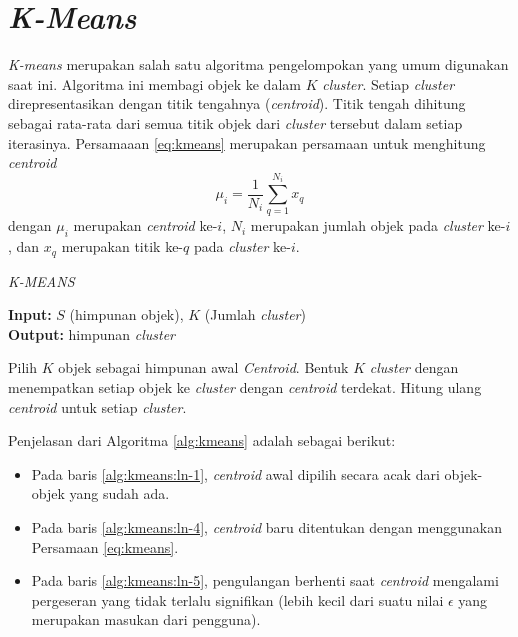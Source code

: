 \section{\textit{K-Means}}
\textit{K-means} merupakan salah satu algoritma pengelompokan yang umum digunakan saat ini. Algoritma ini membagi objek ke dalam $K$ \textit{cluster}. Setiap \textit{cluster} direpresentasikan dengan titik tengahnya (\textit{centroid}). Titik tengah dihitung sebagai rata-rata dari semua titik objek dari \textit{cluster} tersebut dalam setiap iterasinya. Persamaaan \ref{eq:kmeans} merupakan persamaan untuk menghitung \textit{centroid}
\begin{equation}
	\label{eq:kmeans}
	\mu_i=\frac{1}{N_i}\sum_{q=1}^{N_i}x_q
\end{equation}
dengan $\mu_i$ merupakan \textit{centroid} ke-$i$, $N_i$ merupakan jumlah objek pada \textit{cluster} ke-$i$, dan $x_q$ merupakan titik ke-$q$ pada \textit{cluster} ke-$i$.

\begin{algorithm} %
\caption{\textit{K-MEANS}} %
\label{alg:kmeans} %
\begin{flushleft}
	\textbf{Input:} $S$ (himpunan objek), $K$ (Jumlah \textit{cluster})\\
	\textbf{Output:} himpunan \textit{cluster}
\end{flushleft}
\begin{algorithmic}[1] %
	\STATE Pilih $K$ objek sebagai himpunan awal \textit{Centroid}. \label{alg:kmeans:ln-1}
	\REPEAT \label{alg:kmeans:ln-2}
		\STATE Bentuk $K$ \textit{cluster} dengan menempatkan setiap objek ke \textit{cluster} dengan \textit{centroid} terdekat. \label{alg:kmeans:ln-3}
		\STATE Hitung ulang \textit{centroid} untuk setiap \textit{cluster}. \label{alg:kmeans:ln-4}
	 \label{alg:kmeans:ln-5}
\end{algorithmic}
\end{algorithm}

Penjelasan dari Algoritma \ref{alg:kmeans} adalah sebagai berikut:
\begin{itemize}
	\item Pada baris \ref{alg:kmeans:ln-1}, \textit{centroid} awal dipilih secara acak dari objek-objek yang sudah ada.
	\item Pada baris \ref{alg:kmeans:ln-4}, \textit{centroid} baru ditentukan dengan menggunakan Persamaan \ref{eq:kmeans}.
	\item Pada baris \ref{alg:kmeans:ln-5}, pengulangan berhenti saat \textit{centroid} mengalami pergeseran yang tidak terlalu signifikan (lebih kecil dari suatu nilai $\epsilon$ yang merupakan masukan dari pengguna).
\end{itemize}

